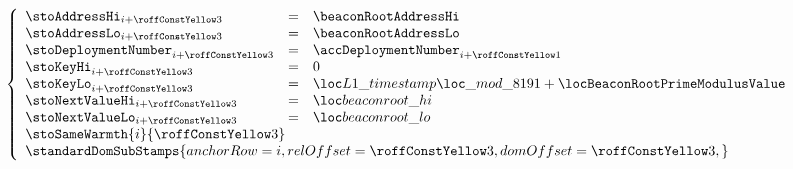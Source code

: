 \item[\underline{\underline{Storing the \inst{BEACONROOT} in the state:}}] 
	\[
		\left\{ \begin{array}{lclr}
			\stoAddressHi         _{i + \roffTxSkipSysiBeaconRootSystemContractStorageSetBeaconRoot} & = & \beaconRootAddressHi                                                       \\
			\stoAddressLo         _{i + \roffTxSkipSysiBeaconRootSystemContractStorageSetBeaconRoot} & = & \beaconRootAddressLo                                                       \\
			\stoDeploymentNumber  _{i + \roffTxSkipSysiBeaconRootSystemContractStorageSetBeaconRoot} & = & \accDeploymentNumber _{i + \roffTxSkipSysiBeaconRootSystemContractAccount} \\
			\stoKeyHi             _{i + \roffTxSkipSysiBeaconRootSystemContractStorageSetBeaconRoot} & = & 0                                                                          \\
			\stoKeyLo             _{i + \roffTxSkipSysiBeaconRootSystemContractStorageSetBeaconRoot} & = & \locLayerOneTimeStampModuloPrime + \locBeaconRootPrimeModulusValue         \\
			\stoNextValueHi       _{i + \roffTxSkipSysiBeaconRootSystemContractStorageSetBeaconRoot} & = & \locBeaconRootHi                                                           \\
			\stoNextValueLo       _{i + \roffTxSkipSysiBeaconRootSystemContractStorageSetBeaconRoot} & = & \locBeaconRootLo                                                           \\
			\multicolumn{3}{l}{\stoSameWarmth  {i}{\roffTxSkipSysiBeaconRootSystemContractStorageSetBeaconRoot} } \\
			\multicolumn{3}{l}{
				\standardDomSubStamps {
					anchorRow = i                                                           ,
					relOffset = \roffTxSkipSysiBeaconRootSystemContractStorageSetBeaconRoot ,
					domOffset = \roffTxSkipSysiBeaconRootSystemContractStorageSetBeaconRoot ,
				}} \\
		\end{array} \right.
	\]
